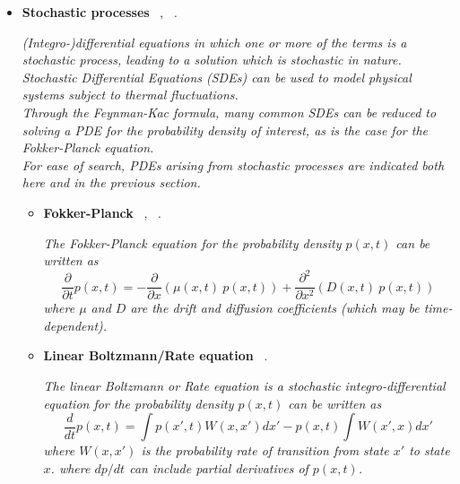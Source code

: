 \documentclass[12pt,letterpaper]{article}
\begin{document}
\begin{itemize}
\begin{itemize}
\begin{itemize}
            \end{itemize}
		\end{itemize}

    \item \textbf{Stochastic processes}  ~\cite{kuboVariationalQuantumSimulations2020, alghassiVariationalQuantumAlgorithm2022},  ~\cite{anQuantumacceleratedMultilevelMonte2021}.

    \emph{(Integro-)differential equations in which one or more of the terms is a stochastic process, leading to a solution which is stochastic in nature. Stochastic Differential Equations (SDEs) can be used to model physical systems subject to thermal fluctuations.\\
    Through the Feynman-Kac formula, many common SDEs can be reduced to solving a PDE for the probability density of interest, as is the case for the Fokker-Planck equation.\\
    For ease of search, PDEs arising from stochastic processes are indicated both here and in the previous section.}

   \begin{itemize} 
        \item \textbf{Fokker-Planck}  ~\cite{jinQuantumSimulationPartial2022a},  ~\cite{garcia-ripollQuantuminspiredAlgorithmsMultivariate2021}.
        
        \textit{The Fokker-Planck equation for the probability density $p(x,t)$ can be written as}
        $$ \dfrac{\partial }{\partial t} p(x,t)  = - \dfrac{\partial }{\partial x} \left( \mu(x,t)~p(x,t)  \right) + \dfrac{\partial^2 }{\partial x^2} \left( D(x,t)~p(x,t)  \right)$$
        \textit{where $\mu$ and $D$ are the drift and diffusion coefficients (which may be time-dependent).}

        \item \textbf{Linear Boltzmann/Rate equation}  ~\cite{jinQuantumSimulationPartial2022a}.

        \textit{The linear Boltzmann or Rate equation  is a stochastic integro-differential equation  for the probability density $p(x,t)$ can be written as}
        $$ \dfrac{d }{d t} p(x,t)  = \int p(x',t) W(x,x') dx' - p(x,t) \int W(x',x) dx' $$
        \textit{where $W(x,x')$ is the probability rate of transition from state $x'$ to state $x$. 
        where $dp/dt$ can include partial derivatives of $p(x,t)$. }
        

\end{itemize}
\end{itemize}
\end{document}
